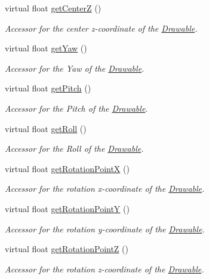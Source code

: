 \begin{DoxyCompactItemize}
virtual float \hyperlink{classtsgl_1_1_drawable_a6a6c0441d94ffebd149f88ae3ab87ced}{get\+CenterZ} ()
\begin{DoxyCompactList}\small\item\em Accessor for the center z-\/coordinate of the \hyperlink{classtsgl_1_1_drawable}{Drawable}. \end{DoxyCompactList}\item 
virtual float \hyperlink{classtsgl_1_1_drawable_a9560ac32d0e19ee79b163c17f163cbb9}{get\+Yaw} ()
\begin{DoxyCompactList}\small\item\em Accessor for the Yaw of the \hyperlink{classtsgl_1_1_drawable}{Drawable}. \end{DoxyCompactList}\item 
virtual float \hyperlink{classtsgl_1_1_drawable_a124df4cd376a550dd52a2b8ed7dd3151}{get\+Pitch} ()
\begin{DoxyCompactList}\small\item\em Accessor for the Pitch of the \hyperlink{classtsgl_1_1_drawable}{Drawable}. \end{DoxyCompactList}\item 
virtual float \hyperlink{classtsgl_1_1_drawable_a311c8e3530138a5d377981cb759d06f3}{get\+Roll} ()
\begin{DoxyCompactList}\small\item\em Accessor for the Roll of the \hyperlink{classtsgl_1_1_drawable}{Drawable}. \end{DoxyCompactList}\item 
virtual float \hyperlink{classtsgl_1_1_drawable_a24835632306f5d78f4e4da96f48937da}{get\+Rotation\+PointX} ()
\begin{DoxyCompactList}\small\item\em Accessor for the rotation x-\/coordinate of the \hyperlink{classtsgl_1_1_drawable}{Drawable}. \end{DoxyCompactList}\item 
virtual float \hyperlink{classtsgl_1_1_drawable_a6a7876f0056f13aa3642c7beaf5949e3}{get\+Rotation\+PointY} ()
\begin{DoxyCompactList}\small\item\em Accessor for the rotation y-\/coordinate of the \hyperlink{classtsgl_1_1_drawable}{Drawable}. \end{DoxyCompactList}\item 
virtual float \hyperlink{classtsgl_1_1_drawable_a755bfd7fc04feb04f1932c0e0886c8e5}{get\+Rotation\+PointZ} ()
\begin{DoxyCompactList}\small\item\em Accessor for the rotation z-\/coordinate of the \hyperlink{classtsgl_1_1_drawable}{Drawable}. \end{DoxyCompactList}\item 

\end{DoxyCompactItemize}
